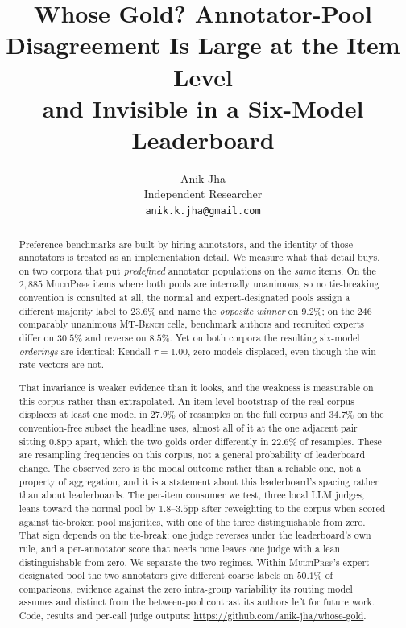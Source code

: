 \documentclass{article}
\title{Whose Gold? Annotator-Pool Disagreement Is Large at the Item Level\\and Invisible in a Six-Model Leaderboard}
\author{Anik Jha\\Independent Researcher\\\texttt{anik.k.jha@gmail.com}}
\begin{document}
\maketitle

\begin{abstract}
Preference benchmarks are built by hiring annotators, and the identity of those
annotators is treated as an implementation detail. We measure what that detail buys, on
two corpora that put \emph{predefined} annotator populations on the \emph{same} items.
On the $2{,}885$ \textsc{MultiPref} items where both pools are internally unanimous, so no
tie-breaking convention is consulted at all, the normal and expert-designated pools assign
a different majority label to $23.6\%$ and name the \emph{opposite winner} on $9.2\%$; on
the $246$ comparably unanimous \textsc{MT-Bench} cells, benchmark authors and recruited
experts differ on $30.5\%$ and reverse on $8.5\%$. Yet on both corpora the resulting
six-model \emph{orderings} are identical: Kendall $\tau = 1.00$, zero models displaced,
even though the win-rate vectors are not.

That invariance is weaker evidence than it looks, and the weakness is measurable on this
corpus rather than extrapolated. An item-level bootstrap of the real corpus displaces at least
one model in $27.9\%$ of resamples on the full corpus and $34.7\%$ on the convention-free
subset the headline uses, almost all of it at the one adjacent pair sitting $0.8$pp apart,
which the two golds order differently in $22.6\%$ of resamples. These are resampling
frequencies on this corpus, not a general probability of leaderboard change. The
observed zero is the modal outcome rather than a reliable one, not a property of
aggregation, and it is a statement about this leaderboard's spacing rather than about
leaderboards. The per-item consumer we test, three local LLM judges, leans toward the
normal pool by $1.8$--$3.5$pp after reweighting to the corpus when scored against
tie-broken pool majorities, with one of the three distinguishable from zero. That sign
depends on the tie-break: one judge reverses under the leaderboard's own rule, and a
per-annotator score that needs none leaves one judge with a lean distinguishable from zero.
We separate the two regimes. Within \textsc{MultiPref}'s expert-designated pool the two
annotators give different coarse labels on $50.1\%$ of comparisons, evidence against the
zero intra-group variability its routing model assumes and distinct from the between-pool
contrast its authors left for future work. Code, results and per-call judge outputs:
\url{https://github.com/anik-jha/whose-gold}.
\end{abstract}
\end{document}
